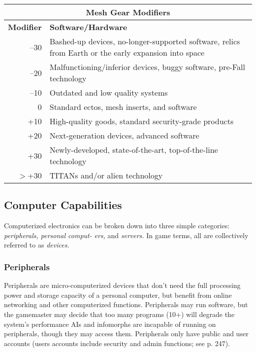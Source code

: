 \begin{table}
\begin{tabular}{|r|l|}
\hline
\multicolumn{2}{|c|}{\textbf{Mesh Gear Modifiers}} \\
\hline
\textbf{Modifier} & \textbf{Software/Hardware} \\
\hline
–30 & Bashed-up devices, no-longer-supported software, relics from Earth or the early expansion into space \\
\hline
–20 & Malfunctioning/inferior devices, buggy software, pre-Fall technology \\
\hline
–10 & Outdated and low quality systems \\
\hline
0 & Standard ectos, mesh inserts, and software \\
\hline
+10 & High-quality goods, standard security-grade products \\
\hline
+20 & Next-generation devices, advanced software \\
\hline
+30 & Newly-developed, state-of-the-art, top-of-the-line technology \\
\hline
$>$+30 & TITANs and/or alien technology \\
\hline
\end{tabular}
\label{tab:mesh-gear-modifiers}
\end{table}

\subsection{Computer Capabilities}

Computerized electronics can be broken down into 
three simple categories: \textit{peripherals, personal comput-}
\textit{ers,  }and  \textit{servers.} In game terms, all are collectively 
referred to as \textit{devices.}

\subsubsection{Peripherals}

Peripherals are micro-computerized devices that don't 
need the full processing power and storage capacity of 
a personal computer, but benefit from online networking
and other computerized functions. Peripherals may
run software, but the gamemaster may decide that too 
many programs (10+) will degrade the system's performance
AIs and infomorphs are incapable of running
on peripherals, though they may access them. Peripherals
only have public and user accounts (users accounts
include security and admin functions; see p. 247).

